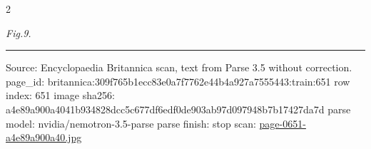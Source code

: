 \documentclass[10pt]{article}
\begin{document}
\begin{multicols}{2}\raggedcolumns
\begin{center}\small\itshape Fig.9.\end{center}
\end{multicols}
\vfill\par\noindent\rule{\linewidth}{0.4pt}\par
{\scriptsize\color{gray}\noindent Source: Encyclopaedia Britannica scan, text from Parse 3.5 without correction. page\_id: britannica:309f765b1ecc83e0a7f7762e44b4a927a7555443:train:651 \quad row index: 651 \quad image sha256: a4e89a900a4041b934828dcc5c677df6edf0de903ab97d097948b7b17427da7d \quad parse model: nvidia/nemotron-3.5-parse \quad parse finish: stop \quad scan: \href{../scans/page-0651-a4e89a900a40.jpg}{page-0651-a4e89a900a40.jpg}\par}
\end{document}
